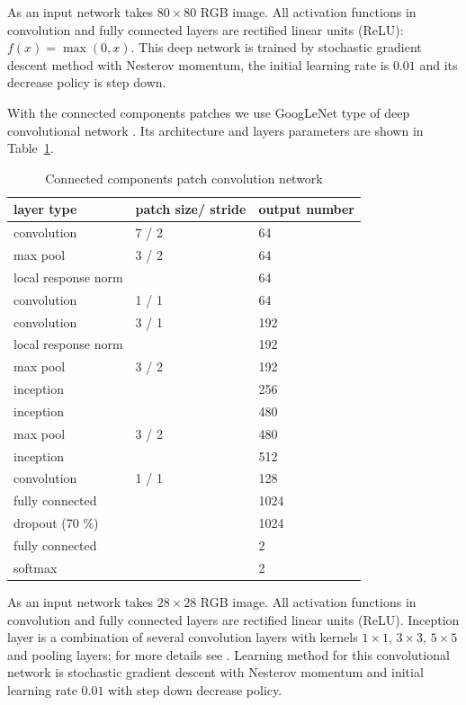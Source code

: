 \documentclass[conference]{IEEEtran}
\begin{document}

As an input network takes $80\times80$ RGB image. All activation functions in convolution and fully connected layers are rectified linear units (ReLU): $f(x)=\max(0, x)$. This deep network is trained by stochastic gradient descent method with Nesterov momentum, the initial learning rate is $0.01$ and its decrease policy is step down. 

With the connected components patches we use GoogLeNet type of deep convolutional network \cite{Googlenet}. Its architecture and layers parameters are shown in Table~\ref{googlenet_tab}.
\begin{table}[!t]
\centering
\caption{Connected components patch convolution network}
\label{googlenet_tab}
\begin{tabular}{|l|p{1.3cm}|p{1.3cm}|}
\hline
\textbf{layer type} & \textbf{patch size/ stride} & \textbf{output number}  \\
\hline
convolution & 7 / 2 & 64 \\
\hline
max pool & 3 / 2 & 64 \\
\hline
local response norm & & 64 \\
\hline
convolution & 1 / 1 & 64 \\
\hline
convolution & 3 / 1 & 192 \\
\hline
local response norm & & 192 \\
\hline
max pool & 3 / 2 & 192 \\
\hline
inception &  & 256 \\
\hline
inception &  & 480 \\
\hline
max pool & 3 / 2 & 480 \\
\hline
inception &  & 512 \\
\hline
convolution & 1 / 1 & 128 \\
\hline
fully connected & & 1024 \\
\hline
dropout (70 \%) & & 1024 \\
\hline
fully connected & & 2 \\
\hline
softmax & & 2 \\
\hline
\end{tabular}
\end{table}		

As an input network takes $28\times28$ RGB image. All activation functions in convolution and fully connected layers are rectified linear units (ReLU). Inception layer is a combination of several convolution layers with kernels $1\times1$, $3\times3$, $5\times5$ and pooling layers; for more details see \cite{Googlenet}. Learning method for this convolutional network is stochastic gradient descent with Nesterov momentum and initial learning rate $0.01$ with step down decrease policy.
\end{document}
